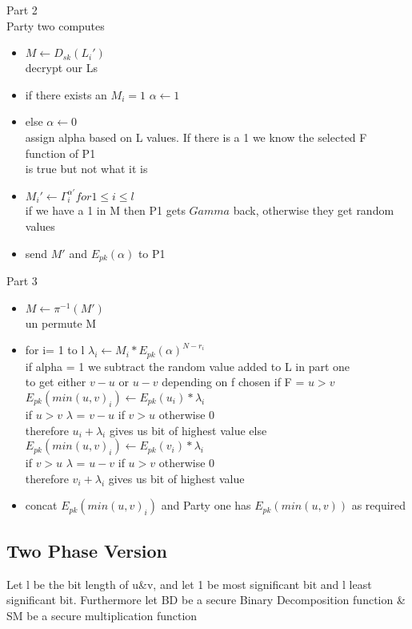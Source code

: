 \documentclass[10pt]{article} %
\begin{document}
Part 2\\
Party two computes
\begin{itemize}
	\item $M \gets D_{sk}(L_i')$
	\\decrypt our Ls
	\item if there exists an $M_i=1$
		\subitem $\alpha \gets 1$
	\item else
		\subitem $\alpha \gets 0$
	\\assign alpha based on L values. If there is a 1 we know the selected F function of P1
	\\is true but not what it is
	\item $M_i' \gets \Gamma_i^{\alpha '} for 1\le i \le l$
	\\if we have a 1 in M then P1 gets $Gamma$ back, otherwise they get random values
	\item send $M'$ and $E_{pk}(\alpha)$ to P1
\end{itemize}
Part 3\\
\begin{itemize}
	\item $M \gets \pi^{-1}(M')$
	\\un permute M
	\item for i= 1 to l
		\subitem $\lambda_i \gets M_i * E_{pk}(\alpha)^{N-r_i}$
		\\if alpha = 1 we subtract the random value added to L in part one
		\\to get either $v-u$ or $u-v$ depending on f chosen
		\subitem if F = $u>v$ 
			\subitem $E_{pk}(min(u,v)_i) \gets E_{pk}(u_i) * \lambda_i$
			\\if $u>v$ $\lambda$ = $v-u$ if $v>u$ otherwise 0
			\\therefore $u_i +\lambda_i$ gives us bit of highest value
		\subitem else
			\subitem $E_{pk}(min(u,v)_i) \gets E_{pk}(v_i) * \lambda_i$
			\\if $v>u$ $\lambda$ = $u-v$ if $u>v$ otherwise 0
			\\therefore $v_i +\lambda_i$ gives us bit of highest value
	\item concat $E_{pk}(min(u,v)_i)$ and Party one has $E_{pk}(min(u,v))$ as required
			
\end{itemize}

\subsection*{\textbf{Two Phase Version}}
Let l be the bit length of u\&v, and let 1 be most significant bit and l least significant bit.
Furthermore let BD be a secure Binary Decomposition function \& SM be a secure multiplication function
\end{document}

